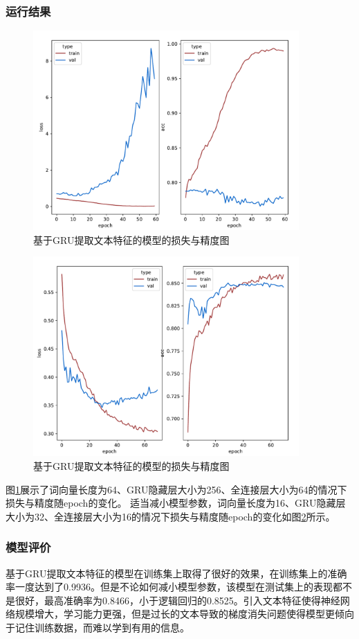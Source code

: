 \documentclass[lang=cn,a4paper]{elegantpaper}
\begin{document}
\subsubsection{运行结果}
\begin{figure}[!htbp]
  \centering
  \includegraphics[width=4in]{image/grutrain.pdf}
  \caption{基于GRU提取文本特征的模型的损失与精度图}
  \label{fig:gru loss}
\end{figure}
\begin{figure}[!htbp]
  \centering
  \includegraphics[width=4in]{image/grutrain2.pdf}
  \caption{基于GRU提取文本特征的模型的损失与精度图}
  \label{fig:gru loss2}
\end{figure}

图\ref{fig:gru loss}展示了词向量长度为64、GRU隐藏层大小为256、全连接层大小为64的情况下损失与精度随epoch的变化。
适当减小模型参数，词向量长度为16、GRU隐藏层大小为32、全连接层大小为16的情况下损失与精度随epoch的变化如图\ref{fig:gru loss2}所示。

\subsubsection{模型评价}
基于GRU提取文本特征的模型在训练集上取得了很好的效果，在训练集上的准确率一度达到了0.9936。但是不论如何减小模型参数，该模型在测试集上的表现都不是很好，最高准确率为0.8466，小于逻辑回归的0.8525。引入文本特征使得神经网络规模增大，学习能力更强，但是过长的文本导致的梯度消失问题使得模型更倾向于记住训练数据，而难以学到有用的信息。
\end{document}
